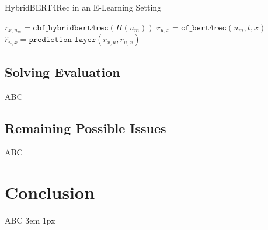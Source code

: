\documentclass{Academic}
\begin{document}
        \begin{algorithm}[ht!]
            \caption{HybridBERT4Rec in an E-Learning Setting}
            \begin{algorithmic}[1]
                    \State $r_{x,u_m} = \texttt{cbf\_hybridbert4rec}(H(u_m))$
                        \State $r_{u, x} = \texttt{cf\_bert4rec}(u_m,t,x)$
                        \State $\hat{r}_{u,x} = \texttt{prediction\_layer}(r_{x,u}, r_{u,x})$
                    \EndFor
                \EndFor
            \end{algorithmic}
        \end{algorithm}

        \FloatBarrier
        \subsection{Solving Evaluation}
        ABC
        \subsection{Remaining Possible Issues}
        ABC
    \section{Conclusion}
    ABC
    \singlespacing
    \emergencystretch 3em
    \hfuzz 1px
    \printbibliography[heading=bibnumbered]




\end{document}
